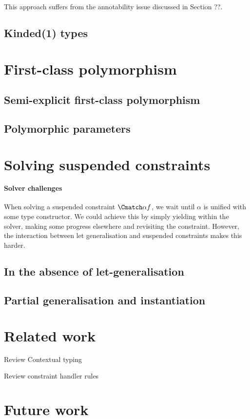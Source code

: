This approach suffers from the annotability issue discussed in Section ??.



\subsection{Kinded(1) types}

\section{First-class polymorphism}

\subsection{Semi-explicit first-class polymorphism}

\subsection{Polymorphic parameters}

\section{Solving suspended constraints}

\paragraph{Solver challenges} When solving a suspended constraint $\Cmatch \alpha f$, we wait until $\alpha$ is unified with some type constructor.
We could achieve this by simply yielding within the solver, making some progress elsewhere and revisiting the constraint. However, the interaction between 
let generalisation and suspended constraints makes this harder.  


\subsection{In the absence of let-generalisation}

\subsection{Partial generalisation and instantiation}

\section{Related work}

Review Contextual typing 

Review constraint handler rules 



\section{Future work}